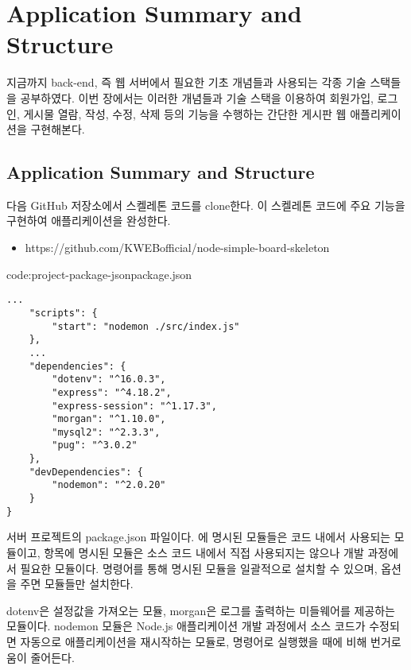 \section{Application Summary and Structure}\label{sect:application-summary-and-structure}

지금까지 back-end, 즉 웹 서버에서 필요한 기초 개념들과 사용되는 각종 기술 스택들을 공부하였다. 이번 장에서는 이러한 개념들과 기술 스택을 이용하여 회원가입, 로그인, 게시물 열람, 작성, 수정, 삭제 등의 기능을 수행하는 간단한 게시판 웹 애플리케이션을 구현해본다.

\subsection*{Application Summary and Structure}

다음 GitHub 저장소에서 스켈레톤 코드를 clone한다. 이 스켈레톤 코드에 주요 기능을 구현하여 애플리케이션을 완성한다.

\begin{itemize}
    \item https://github.com/KWEBofficial/node-simple-board-skeleton
\end{itemize}

\begin{codeenv}{code:project-package-json}{package.json}\begin{verbatim}
...
    "scripts": {
        "start": "nodemon ./src/index.js"
    },
    ...
    "dependencies": {
        "dotenv": "^16.0.3",
        "express": "^4.18.2",
        "express-session": "^1.17.3",
        "morgan": "^1.10.0",
        "mysql2": "^2.3.3",
        "pug": "^3.0.2"
    },
    "devDependencies": {
        "nodemon": "^2.0.20"
    }
}
\end{verbatim}
\end{codeenv}

\은 서버 프로젝트의 package.json 파일이다. 에 명시된 모듈들은 코드 내에서 사용되는 모듈이고,  항목에 명시된 모듈은 소스 코드 내에서 직접 사용되지는 않으나 개발 과정에서 필요한 모듈이다.  명령어를 통해 명시된 모듈을 일괄적으로 설치할 수 있으며,  옵션을 주면  모듈들만 설치한다.

dotenv은 설정값을 가져오는 모듈, morgan은 로그를 출력하는 미들웨어를 제공하는 모듈이다. nodemon 모듈은 Node.js 애플리케이션 개발 과정에서 소스 코드가 수정되면 자동으로 애플리케이션을 재시작하는 모듈로,  명령어로 실행했을 때에 비해 번거로움이 줄어든다.
\clearpage

